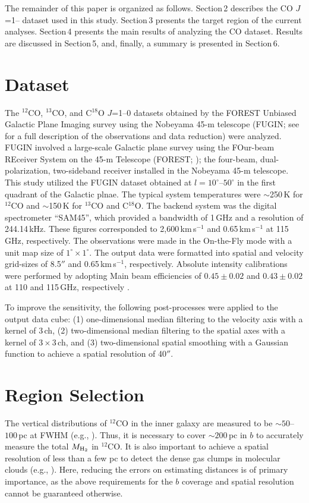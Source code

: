 \documentclass[proof]{pasj01}
\begin{document}
The remainder of this paper is organized as follows.
Section\,2 describes the CO $J$=1-- dataset used in this study. 
Section\,3 presents the target region of the current analyses.
Section\,4 presents the main results of analyzing the CO dataset. 
Results are discussed in Section\,5, and, finally, a summary is presented in Section\,6.



\section{Dataset}
The $^{12}$CO, $^{13}$CO, and C$^{18}$O $J$=1--0 datasets obtained by the FOREST Unbiased Galactic Plane Imaging survey using the Nobeyama 45-m telescope (FUGIN; see \cite{ume2017} for a full description of the observations and data reduction) were analyzed. 
FUGIN involved a large-scale Galactic plane survey using the FOur-beam REceiver System on the 45-m Telescope (FOREST; \cite{min2016}); the four-beam, dual-polarization, two-sideband receiver installed in the Nobeyama 45-m telescope. 
This study utilized the FUGIN dataset obtained at $l=10^\circ$--$50^\circ$ in the first quadrant of the Galactic plnae.
The typical system temperatures were $\sim$250\,K for $^{12}$CO and $\sim$150\,K for $^{13}$CO and C$^{18}$O.
The backend system was the digital spectrometer ``SAM45'', which provided a bandwidth of 1\,GHz and a resolution of 244.14\,kHz. 
These figures corresponded to 2,600\,km\,s$^{-1}$ and 0.65\,km\,s$^{-1}$ at 115\,GHz, respectively.  
The observations were made in the On-the-Fly mode with a unit map size of $1^\circ \times 1^\circ$.
The output data were formatted into spatial and velocity grid-sizes of 8.5$''$ and 0.65\,km\,s$^{-1}$, respectively. 
Absolute intensity calibrations were performed by adopting Main beam efficiencies of $0.45\pm0.02$ and $0.43\pm0.02$ at 110 and 115\,GHz, respectively \citep{ume2017}.

To improve the sensitivity, the following post-processes were applied to the output data cube: 
(1) one-dimensional median filtering to the velocity axis with a kernel of 3\,ch,
(2) two-dimensional median filtering to the spatial axes with a kernel of $3\times3$\,ch,
and (3) two-dimensional spatial smoothing with a Gaussian function to achieve a spatial resolution of 40$''$. 


\section{Region Selection}
The vertical distributions of $^{12}$CO in the inner galaxy are measured to be $\sim50$--$100$\,pc at FWHM (e.g., \cite{nak2006}). Thus, it is necessary to cover $\sim200$\,pc in $b$ to accurately measure the total $M_{\rm H_2}$ in $^{12}$CO.
It is also important to achieve a spatial resolution of less than a few pc to detect the dense gas clumps in molecular clouds (e.g., \cite{ber2007}). Here, reducing the errors on estimating distances is of primary importance, as the above requirements for the $b$ coverage and spatial resolution cannot be guaranteed otherwise.
\end{document}
